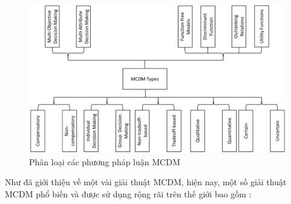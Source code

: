 \begin{figure}[H]
    \centering
    \includegraphics[width=0.8\linewidth, height=0.35\textheight]{images/MCDMtype.png}
    \vspace{0.6cm}
    \caption{Phân loại các phương pháp luận MCDM}
\end{figure}

Như đã giới thiệu về một vài giải thuật MCDM, hiện nay, một số giải thuật MCDM phổ biến và được sử dụng rộng rãi trên thế giới bao gồm \cite{sciencedirect1}: 

